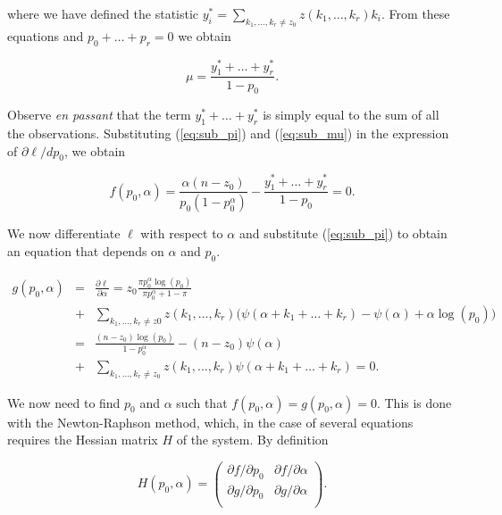 \documentclass[12pt]{article}
\begin{document}
\begin{appendices}
    \noindent
    where we have defined the statistic
    $y_i^* = \sum_{k_1, \ldots, k_r \neq z_0} z(k_1, \ldots, k_r) k_i$.
    From these equations and $p_0+\ldots+p_r = 0$ we obtain

    \begin{equation}
\label{eq:sub_mu}
      \mu = \frac{y_1^*+\ldots+y_r^*}{1-p_0}.
    \end{equation}

    Observe \textit{en passant} that the term
    $y_1^* + \ldots + y_r^*$ is simply equal to the sum of all the
    observations.
    Substituting (\ref{eq:sub_pi}) and (\ref{eq:sub_mu}) in the
    expression of $\partial\ell/dp_0$, we obtain

    \begin{equation}
      f(p_0, \alpha) = \frac{\alpha(n-z_0)}{p_0(1-p_0^{\alpha})} -
      \frac{y_1^*+\ldots+y_r^*}{1-p_0} = 0.
    \end{equation}

    We now differentiate $\ell$ with respect to $\alpha$ and
    substitute (\ref{eq:sub_pi}) to obtain an equation that
    depends on $\alpha$ and $p_0$.

    \begin{eqnarray*}
      g(p_0, \alpha) &=& \frac{\partial\ell}{\partial\alpha} =
      z_0 \frac{\pi p_0^{\alpha}\log(p_0)}
      {\pi p_0^{\alpha}+1-\pi} \\
      &+& \sum_{k_1, \ldots, k_r \neq z0}
      z(k_1, \ldots, k_r) \Big(\psi(\alpha+k_1 + \ldots +k_r)
      -\psi(\alpha) +\alpha\log(p_0)\Big) \\
        &=& \frac{(n-z_0)\log(p_0)}{1-p_0^{\alpha}}
        -(n-z_0) \psi(\alpha) \\
        &+& \sum_{k_1, \ldots, k_r \neq z_0} z(k_1, \ldots, k_r)
        \psi(\alpha+k_1 + \ldots +k_r) = 0.
    \end{eqnarray*}

    We now need to find $p_0$ and $\alpha$ such that
    $f(p_0, \alpha) = g(p_0, \alpha) = 0$. This is done with the
    Newton-Raphson method, which, in the case of several equations
    requires the Hessian matrix $H$ of the system. By definition

    \begin{equation*}
      H(p_0,\alpha) = \left(
      \begin{array}{ll}
        \partial f/\partial p_0 &
        \partial f/\partial \alpha  \\
        \partial g/\partial p_0 &
        \partial g/\partial \alpha  \\
      \end{array}
      \right).
    \end{equation*}


\end{appendices}
\end{document}
